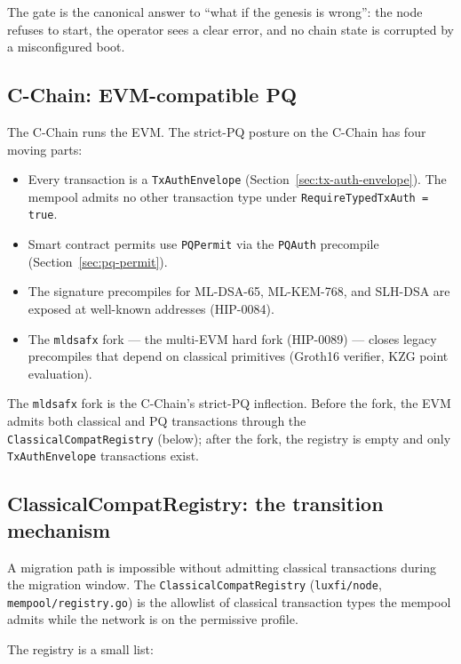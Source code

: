 The gate is the canonical answer to ``what if the genesis is wrong'': the
node refuses to start, the operator sees a clear error, and no chain state
is corrupted by a misconfigured boot.

\subsection{C-Chain: EVM-compatible PQ}

The C-Chain runs the EVM. The strict-PQ posture on the C-Chain has four
moving parts:

\begin{itemize}[leftmargin=2em,nosep]
  \item Every transaction is a \texttt{TxAuthEnvelope}
    (Section~\ref{sec:tx-auth-envelope}). The mempool admits no other
    transaction type under \texttt{RequireTypedTxAuth = true}.
  \item Smart contract permits use \texttt{PQPermit} via the
    \texttt{PQAuth} precompile (Section~\ref{sec:pq-permit}).
  \item The signature precompiles for ML-DSA-65, ML-KEM-768, and SLH-DSA
    are exposed at well-known addresses (HIP-0084).
  \item The \texttt{mldsafx} fork --- the multi-EVM hard fork (HIP-0089)
    --- closes legacy precompiles that depend on classical primitives
    (Groth16 verifier, KZG point evaluation).
\end{itemize}

The \texttt{mldsafx} fork is the C-Chain's strict-PQ inflection. Before the
fork, the EVM admits both classical and PQ transactions through the
\texttt{ClassicalCompatRegistry} (below); after the fork, the registry is
empty and only \texttt{TxAuthEnvelope} transactions exist.

\subsection{ClassicalCompatRegistry: the transition mechanism}

A migration path is impossible without admitting classical transactions
during the migration window. The \texttt{ClassicalCompatRegistry}
(\texttt{luxfi/node}, \texttt{mempool/registry.go}) is the allowlist of
classical transaction types the mempool admits while the network is on the
permissive profile.

The registry is a small list:

